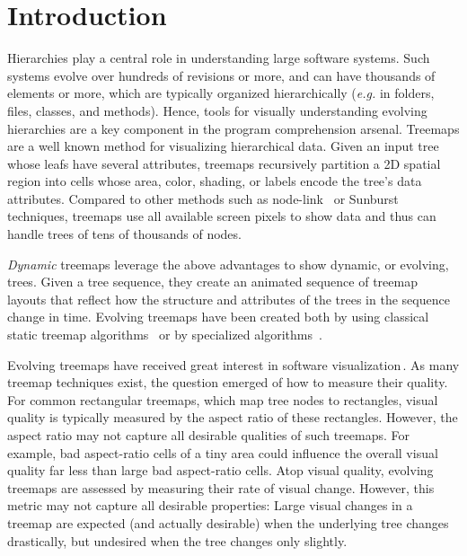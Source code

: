 \section{Introduction}
\label{sec:treemap_eval_intro}
%
Hierarchies play a central role in understanding large software systems. Such systems evolve over hundreds of revisions or more, and can have thousands of elements or more, which are typically organized hierarchically (\emph{e.g.} in folders, files, classes, and methods). Hence, tools for visually understanding evolving hierarchies are a key component in the program comprehension arsenal. Treemaps are a well known method for visualizing hierarchical data. Given an input tree whose leafs have several attributes, treemaps recursively partition a 2D spatial region into cells whose area, color, shading, or labels encode the tree's data attributes. Compared to other methods such as node-link~\citep{harel,frick} or Sunburst~\citep{sunburst,sunburst2} techniques, treemaps use all available screen pixels to show data and thus can handle trees of tens of thousands of nodes.

\emph{Dynamic} treemaps leverage the above advantages to show dynamic, or evolving, trees. Given a tree sequence, they create an animated sequence of treemap layouts that reflect how the structure and attributes of the trees in the sequence change in time. Evolving treemaps have been created both by using classical static treemap algorithms~\citep{treevis} or by specialized algorithms~\citep{sondag17,hees17,hahn10}.

Evolving treemaps have received great interest in software visualization\,\citep{diehl08,hees17,hahn10,fisher10,gotz11}. As many treemap techniques exist, the question emerged of how to measure their quality. For common rectangular treemaps, which map tree nodes to rectangles, visual quality is typically measured by the aspect ratio of these rectangles. However, the aspect ratio may not capture all desirable qualities of such treemaps. For example, bad aspect-ratio cells of a tiny area could influence the overall visual quality far less than large bad aspect-ratio cells. Atop visual quality, evolving treemaps are assessed by measuring their rate of visual change. However, this metric may not capture all desirable properties: Large visual changes in a treemap are expected (and actually desirable) when the underlying tree changes drastically, but undesired when the tree changes only slightly.

